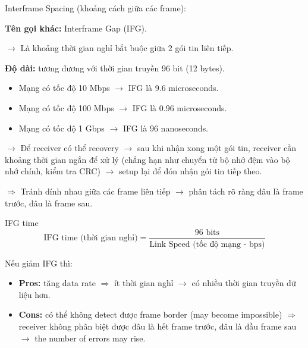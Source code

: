 \noindent
Interframe Spacing (khoảng cách giữa các frame):
\medskip

\noindent
\textbf{Tên gọi khác:} Interframe Gap (IFG).

$\rightarrow$ Là khoảng thời gian nghỉ bắt buộc giữa 2 gói tin liên tiếp.
\medskip

\noindent
\textbf{Độ dài:} tương đương với thời gian truyền 96 bit (12 bytes).

\begin{itemize}
    \item Mạng có tốc độ  10 Mbps $\rightarrow$ IFG là 9.6 microseconds.
    \item Mạng có tốc độ 100 Mbps $\rightarrow$ IFG là 0.96 microseconds.
    \item Mạng có tốc độ 1 Gbps $\rightarrow$ IFG là 96 nanoseconds.
\end{itemize}
\medskip

\noindent
$\rightarrow$ Để receiver có thể recovery $\rightarrow$ sau khi nhận xong một gói tin, receiver cần khoảng thời gian ngắn để xử lý (chẳng hạn như chuyển từ bộ nhớ đệm vào bộ nhớ chính, kiểm tra CRC) $\rightarrow$ setup lại để đón nhận gói tin tiếp theo.
\medskip

$\Rightarrow$ Tránh dính nhau giữa các frame liên tiếp $\rightarrow$ phân tách rõ ràng đâu là frame trước, đâu là frame sau.
\medskip


\begin{mybox}{IFG time}
\begin{equation*}
    \text{IFG time (thời gian nghỉ)} = \frac{96 \text{ bits}}{\text{Link Speed (tốc độ mạng - bps)}}
\end{equation*}
\end{mybox}

\noindent
Nếu giảm IFG thì:

\begin{itemize}
    \item \textbf{Pros:} tăng data rate $\Rightarrow$ ít thời gian nghỉ $\rightarrow$ có nhiều thời gian truyền dữ liệu hơn.
    \item \textbf{Cons:} có thể không detect được frame border (may become impossible) $\Rightarrow$ receiver không phân biệt được đâu là hết frame trước, đâu là đầu frame sau $\rightarrow$ the number of errors may rise.
\end{itemize}
\medskip

